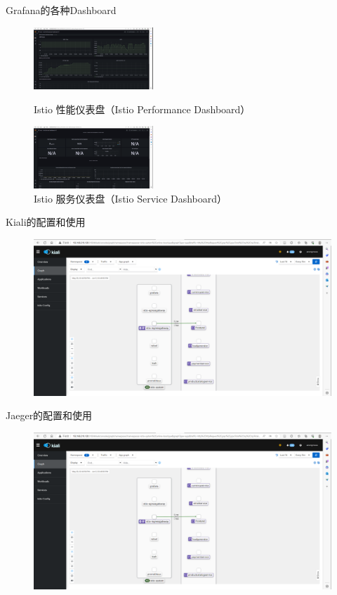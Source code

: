 \documentclass{beamer}
\begin{document}
\begin{frame}{Grafana的各种Dashboard}
	\begin{figure}[hdbp]
			\subfloat
		{\includegraphics[width=0.4\textwidth]{pic/PD.png}
			\caption{Istio 性能仪表盘（Istio Performance Dashboard）}}
		\subfloat
		{\includegraphics[width=0.4\textwidth]{pic/SD.png}
			\caption{Istio 服务仪表盘（Istio Service Dashboard）}}
	\end{figure}
\end{frame}

\begin{frame}{Kiali的配置和使用}
\begin{figure}[H]
	\centering
	\includegraphics[width=1.0\textwidth]{pic/online-boutique-kiali.png}
	\caption{}
\end{figure}
\end{frame}
\begin{frame}{Jaeger的配置和使用}
\begin{figure}[H]
	\centering
	\includegraphics[width=1.0\textwidth]{pic/online-boutique-kiali.png}
	\caption{}
\end{figure}
\end{frame}
\end{document}

